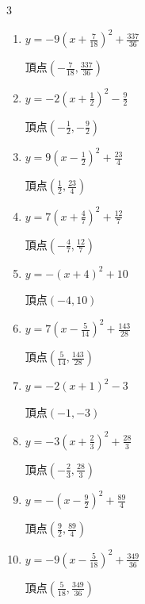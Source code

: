 \begin{multicols}{3}
\begin{enumerate}
  \item $\displaystyle y=-9\left( x+\frac{7}{18}\right)^{2}+\frac{337}{36}$

        $\displaystyle 頂点\left( -\frac{7}{18} , \frac{337}{36} \right)$

  \item $\displaystyle y=-2\left( x+\frac{1}{2}\right)^{2}-\frac{9}{2}$

        $\displaystyle 頂点\left( -\frac{1}{2} , -\frac{9}{2} \right)$

  \item $\displaystyle y=9\left( x-\frac{1}{2}\right)^{2}+\frac{23}{4}$

        $\displaystyle 頂点\left( \frac{1}{2} , \frac{23}{4} \right)$

  \item $\displaystyle y=7\left( x+\frac{4}{7}\right)^{2}+\frac{12}{7}$

        $\displaystyle 頂点\left( -\frac{4}{7} , \frac{12}{7} \right)$

  \item $\displaystyle y=-\left( x+4\right)^{2}+10$

        $\displaystyle 頂点\left( -4 , 10 \right)$

  \item $\displaystyle y=7\left( x-\frac{5}{14}\right)^{2}+\frac{143}{28}$

        $\displaystyle 頂点\left( \frac{5}{14} , \frac{143}{28} \right)$

  \item $\displaystyle y=-2\left( x+1\right)^{2}-3$

        $\displaystyle 頂点\left( -1 , -3 \right)$

  \item $\displaystyle y=-3\left( x+\frac{2}{3}\right)^{2}+\frac{28}{3}$

        $\displaystyle 頂点\left( -\frac{2}{3} , \frac{28}{3} \right)$

  \item $\displaystyle y=-\left( x-\frac{9}{2}\right)^{2}+\frac{89}{4}$

        $\displaystyle 頂点\left( \frac{9}{2} , \frac{89}{4} \right)$

  \item $\displaystyle y=-9\left( x-\frac{5}{18}\right)^{2}+\frac{349}{36}$

        $\displaystyle 頂点\left( \frac{5}{18} , \frac{349}{36} \right)$

\columnbreak %


\end{enumerate}
\end{multicols}
